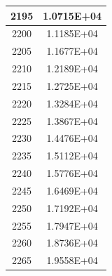 \documentclass[a4paper]{article}
\begin{document}
\begin{tabular}{|c|c|}
		2195 & 1.0715E+04 \\
		\hline
		2200 & 1.1185E+04 \\
		\hline
		2205 & 1.1677E+04 \\
		\hline
		2210 & 1.2189E+04 \\
		\hline
		2215 & 1.2725E+04 \\
		\hline
		2220 & 1.3284E+04 \\
		\hline
		2225 & 1.3867E+04 \\
		\hline
		2230 & 1.4476E+04 \\
		\hline
		2235 & 1.5112E+04 \\
		\hline
		2240 & 1.5776E+04 \\
		\hline
		2245 & 1.6469E+04 \\
		\hline
		2250 & 1.7192E+04 \\
		\hline
		2255 & 1.7947E+04 \\
		\hline
		2260 & 1.8736E+04 \\
		\hline
		2265 & 1.9558E+04 \\
		\hline
	\end{tabular}
	\hfill
\end{document}
